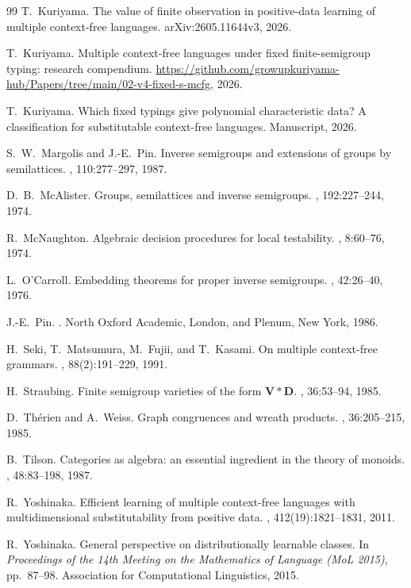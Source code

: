 \documentclass[11pt,a4paper]{ltjsarticle}
\numberwithin{equation}{section}
\theoremstyle{plain}
\theoremstyle{definition}
\theoremstyle{remark}
\theoremstyle{plain}
\begin{document}
\begin{thebibliography}{99}
T.~Kuriyama.
\newblock The value of finite observation in positive-data learning of multiple
context-free languages.
\newblock arXiv:2605.11644v3, 2026.

T.~Kuriyama.
\newblock Multiple context-free languages under fixed finite-semigroup typing:
research compendium.
\newblock \url{https://github.com/growupkuriyama-hub/Papers/tree/main/02-v4-fixed-s-mcfg},
2026.

T.~Kuriyama.
\newblock Which fixed typings give polynomial characteristic data? A
classification for substitutable context-free languages.
\newblock Manuscript, 2026.

S.~W.~Margolis and J.-E.~Pin.
\newblock Inverse semigroups and extensions of groups by semilattices.
, 110:277--297, 1987.

D.~B.~McAlister.
\newblock Groups, semilattices and inverse semigroups.
, 192:227--244,
1974.

R.~McNaughton.
\newblock Algebraic decision procedures for local testability.
, 8:60--76, 1974.

L.~O'Carroll.
\newblock Embedding theorems for proper inverse semigroups.
, 42:26--40, 1976.

J.-E.~Pin.
.
\newblock North Oxford Academic, London, and Plenum, New York, 1986.

H.~Seki, T.~Matsumura, M.~Fujii, and T.~Kasami.
\newblock On multiple context-free grammars.
, 88(2):191--229, 1991.

H.~Straubing.
\newblock Finite semigroup varieties of the form $\mathbf V*\mathbf D$.
, 36:53--94, 1985.

D.~Th\'erien and A.~Weiss.
\newblock Graph congruences and wreath products.
, 36:205--215, 1985.

B.~Tilson.
\newblock Categories as algebra: an essential ingredient in the theory of
monoids.
, 48:83--198, 1987.

R.~Yoshinaka.
\newblock Efficient learning of multiple context-free languages with
multidimensional substitutability from positive data.
, 412(19):1821--1831, 2011.

R.~Yoshinaka.
\newblock General perspective on distributionally learnable classes.
\newblock In {\em Proceedings of the 14th Meeting on the Mathematics of Language
(MoL 2015)}, pp.~87--98. Association for Computational Linguistics, 2015.

\end{thebibliography}
\end{document}
